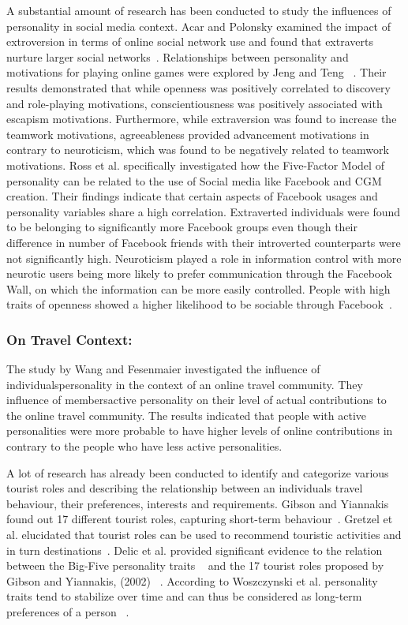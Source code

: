 A substantial amount of research has been conducted to study the influences of personality in social media context. Acar and Polonsky examined the impact of extroversion in terms of online social network use and found that extraverts nurture larger social networks~\cite{acar2007online}. Relationships between personality and motivations for playing online games were explored by Jeng and Teng ~\cite{jeng2008personality}. Their results demonstrated that while openness was positively correlated to discovery and role-playing motivations, conscientiousness was positively associated with escapism motivations. Furthermore, while extraversion was found to increase the teamwork motivations, agreeableness provided advancement motivations in contrary to neuroticism, which was found to be negatively related to teamwork motivations. Ross et al. specifically investigated how the Five-Factor Model of personality can be related to the use of Social media like Facebook and CGM creation. Their findings indicate that certain aspects of Facebook usages and personality variables share a high correlation. Extraverted individuals were found to be belonging to significantly more Facebook groups even though their difference in number of Facebook friends with their introverted counterparts were not significantly high. Neuroticism played a role in information control with more neurotic users being more likely to prefer communication through the Facebook Wall, on which the information can be more easily controlled. People with high traits of openness showed a higher likelihood to be sociable through Facebook~\cite{ross2009personality}. 


\subsubsection{On Travel Context: }\label{3.3}

The study by Wang and Fesenmaier investigated the influence of individuals\textquotesingle  personality in the context of an online travel community. They influence of members\textquotesingle  active personality on their level of actual contributions to the online travel community. The results indicated that people with active personalities were more probable to have higher levels of online contributions in contrary to the people who have less active personalities.


A lot of research has already been conducted to identify and categorize various tourist roles and describing the relationship between an individual\textquotesingle s travel behaviour, their preferences, interests and requirements. Gibson and Yiannakis found out 17 different tourist roles, capturing short-term behaviour~\cite{gibson2002tourist}. Gretzel et al. elucidated that tourist roles can be used to recommend touristic activities and in turn destinations~\cite{gretzel2006travel}. Delic et al. provided significant evidence to the relation between the Big-Five personality traits ~\cite{goldberg1990alternative} and the 17 tourist roles proposed by Gibson and Yiannakis, (2002) ~\cite{delic2016sun}. According to Woszczynski et al. personality traits tend to stabilize over time and can thus be considered as long-term preferences of a person ~\cite{woszczynski2002exploring}.

